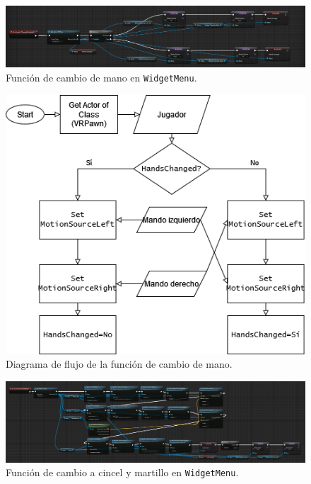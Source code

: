 \begin{figure}[H]
	\centering
	\includegraphics[width=12cm]{imagenes/changedominant}
	\caption{Función de cambio de mano en \texttt{WidgetMenu}.}
	\label{fig:changedominant}
\end{figure}

\begin{figure}[H]
	\centering
	\includegraphics[width=12cm]{imagenes/flowchart6}
	\caption{Diagrama de flujo de la función de cambio de mano.}
	\label{fig:fc6}
\end{figure}

\begin{figure}[H]
	\centering
	\includegraphics[width=12cm]{imagenes/cambiaracincel}
	\caption{Función de cambio a cincel y martillo en \texttt{WidgetMenu}.}
	\label{fig:cambiaracincel}
\end{figure}

